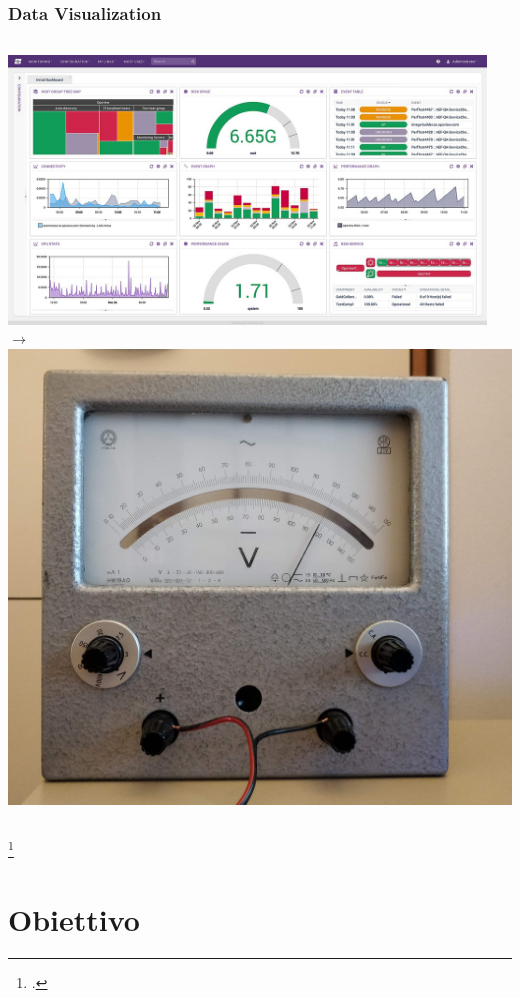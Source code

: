 \documentclass[aspectratio=169]{beamer}
\begin{document}
\begin{frame}
\frametitle{Data Visualization}

\begin{columns}
  \includegraphics[width=0.95\textwidth]{datadash}\footnotemark 
{}\centering$\rightarrow$
  \includegraphics[width=\textwidth]{interventominimale}
\end{columns}

\footcitetext{wiki:datadash}
\end{frame}%

\section{Obiettivo}
\end{document}
